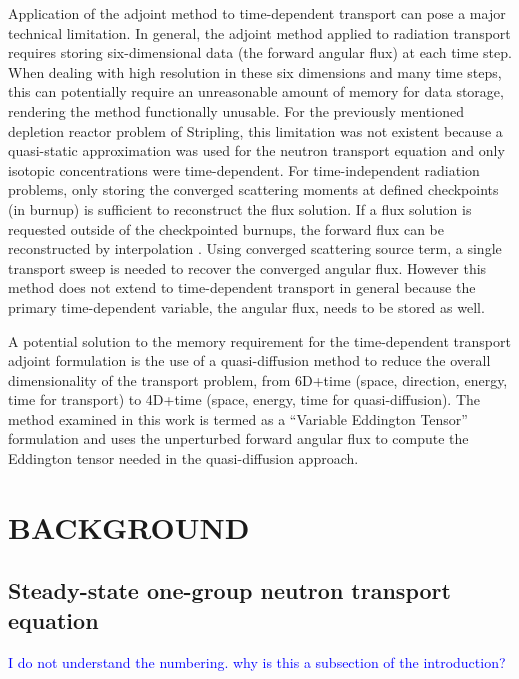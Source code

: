 \documentclass[12pt]{report}
\newcommand{\comment}[2]{\marginpar{\textcolor{#2}{$\star$}}\textcolor{#2}{#1}\newline}
\newcommand{\jcr}[1]{\comment{#1}{blue}}
\newcommand{\jcr}[1]{\phantom{a}}
\begin{document}
Application of the adjoint method to time-dependent transport can pose a major technical limitation. In general, the adjoint method applied to radiation transport requires storing six-dimensional data (the forward angular flux) at each time step. When dealing with high resolution in these six dimensions and many time steps, this can potentially require an unreasonable amount of memory for data storage, rendering the method functionally unusable. For the previously mentioned depletion reactor problem of Stripling, this limitation was not existent because a quasi-static approximation was used for the neutron transport equation and only isotopic concentrations were time-dependent. For time-independent radiation problems, only storing the converged scattering moments at defined checkpoints (in burnup) is sufficient to reconstruct the flux solution. If a flux solution is requested outside of the checkpointed burnups, the forward flux can be reconstructed by interpolation \cite{Stripling}.
Using converged scattering source term, a single transport sweep is needed to recover the converged
angular flux. However this method does not extend to time-dependent transport in general because
the primary time-dependent variable, the angular flux, needs to be stored as well. 

A potential solution to the memory requirement for the time-dependent transport adjoint formulation is the use of a quasi-diffusion method to reduce the overall dimensionality of the transport problem, from 6D+time (space, direction, energy, time for transport) to 4D+time (space, energy, time for quasi-diffusion). The method examined in this work is termed  as a ``Variable Eddington Tensor'' formulation and uses the unperturbed forward angular flux to compute the Eddington tensor needed in the quasi-diffusion approach.

\chapter{\uppercase {Background}}
\section{Steady-state one-group neutron transport equation}
\jcr{I do not understand the numbering. why is this a subsection of the introduction?}
\end{document}
